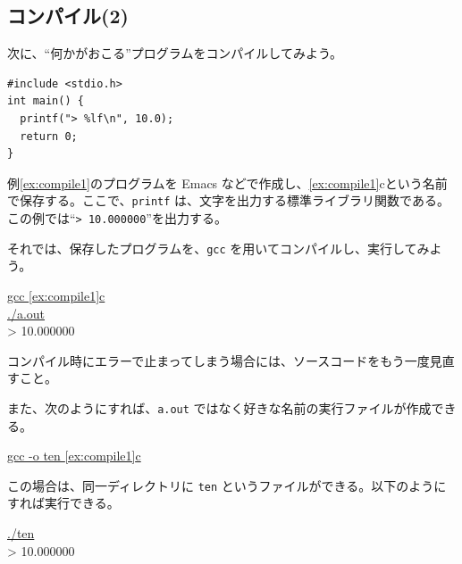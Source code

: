 \subsection{コンパイル(2)}

次に、``何かがおこる''プログラムをコンパイルしてみよう。
\begin{reidai}\label{ex:compile1}
\begin{verbatim}
#include <stdio.h>
int main() {
  printf("> %lf\n", 10.0);
  return 0;
}
\end{verbatim}
\end{reidai} \noindent
例\ref{ex:compile1}のプログラムを Emacs などで作成し、\ref{ex:compile1}cという名前で保存する。ここで、\verb+printf+ は、文字を出力する標準ライブラリ関数である。この例では``\verb+> 10.000000+''を出力する。

それでは、保存したプログラムを、\verb+gcc+ を用いてコンパイルし、実行してみよう。
\begin{commandline2}
\prompt \underline{gcc \ref{ex:compile1}c} \\
\prompt \underline{./a.out} \\
> 10.000000
\end{commandline2} \noindent
コンパイル時にエラーで止まってしまう場合には、ソースコードをもう一度見直すこと。

また、次のようにすれば、\verb+a.out+ ではなく好きな名前の実行ファイルが作成できる。
\begin{commandline2}
\prompt \underline{gcc -o ten \ref{ex:compile1}c}
\end{commandline2} \noindent
この場合は、同一ディレクトリに \verb+ten+ というファイルができる。以下のようにすれば実行できる。
\begin{commandline2}
\prompt \underline{./ten} \\
> 10.000000
\end{commandline2}

